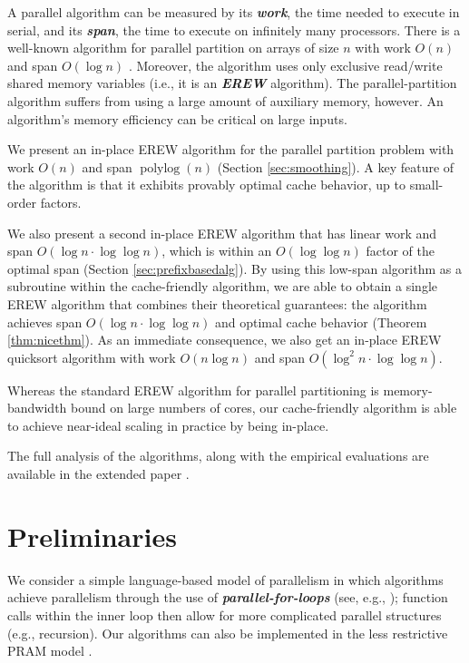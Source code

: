 \documentclass[sigconf, 10pt, nonacm]{acmart}
\newcommand{\polylog}{\operatorname{polylog}}
\newcommand{\defn}[1]{{\textit{\textbf{\boldmath #1}}}}
\renewcommand{\paragraph}[1]{\vspace{0.09in}\noindent{\bf \boldmath #1.}}
\theoremstyle{remark}
\theoremstyle{remark}
\begin{document}
A parallel algorithm can be measured by its \defn{work}, the time
needed to execute in serial, and its \defn{span}, the time to execute
on infinitely many processors. There is a well-known algorithm for
parallel partition on arrays of size $n$ with work $O(n)$ and span
$O(\log n)$ \cite{Blelloch96,AcarBl16}. Moreover, the algorithm uses
only exclusive read/write shared memory variables (i.e., it is an
\defn{EREW} algorithm).
The parallel-partition algorithm suffers from using a large amount of
auxiliary memory, however.
An algorithm's memory efficiency can be critical on large inputs.

\paragraph{Results}
We present an in-place EREW algorithm for the parallel partition problem with
work $O(n)$ and span $\polylog(n)$ (Section \ref{sec:smoothing}). A key
feature of the algorithm is that it exhibits provably optimal cache behavior,
up to small-order factors.

We also present a second in-place EREW algorithm that has linear work and span
$O(\log n \cdot \log \log n)$, which is within an $O(\log\log n)$ factor of the
optimal span (Section \ref{sec:prefixbasedalg}). By using this low-span
algorithm as a subroutine within the cache-friendly algorithm, we are able to
obtain a single EREW algorithm that combines their theoretical guarantees: the
algorithm achieves span $O(\log n \cdot \log \log n)$ and optimal cache
behavior (Theorem \ref{thm:nicethm}). As an immediate consequence, we also get an in-place EREW quicksort
algorithm with work $O(n \log n)$ and span $O(\log^2 n \cdot \log \log n)$.

Whereas the standard EREW algorithm for parallel partitioning is
memory-bandwidth bound on large numbers of cores, our cache-friendly
algorithm is able to achieve near-ideal scaling in practice by being in-place.

The full analysis of the algorithms, along with the empirical evaluations are available in the extended paper \cite{ARXIV}.


\section{Preliminaries}\label{secprelim}

\paragraph{Workflow Model} We consider a simple language-based model of parallelism in which algorithms achieve parallelism through the use of \defn{parallel-for-loops} (see, e.g.,
\cite{Blelloch96,AcarBl16,CLRS}); function calls within the inner loop
then allow for more complicated parallel structures (e.g., recursion). Our algorithms can also be implemented in the less restrictive PRAM model \cite{Blelloch96, AcarBl16}.
\end{document}
